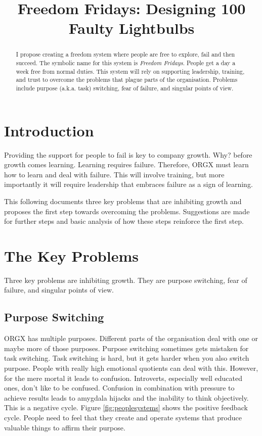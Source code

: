 \documentclass[conference]{IEEEtran}
\begin{document}
\title{Freedom Fridays: Designing 100 Faulty Lightbulbs}

\author{
}

\maketitle

\begin{abstract}
I propose creating a freedom system where people are free to explore, fail and
then succeed. The symbolic name for this system is \emph{Freedom Fridays}.
People get a day a week free from normal duties. This system will rely on
supporting leadership, training, and trust to overcome the problems that plague
parts of the organisation. Problems include purpose (a.k.a. task) switching,
fear of failure, and singular points of view.
\end{abstract}

\section{Introduction}
Providing the support for people to fail is key to company growth. Why? before
growth comes learning. Learning requires failure. Therefore, ORGX must
learn how to learn and deal with failure. This will involve training, but more
importantly it will require leadership that embraces failure as a sign of learning.

This following documents three key problems that are inhibiting growth and
proposes the first step towards overcoming the problems. Suggestions are made
for further steps and basic analysis of how these steps reinforce the first
step.

\section{The Key Problems}
Three key problems are inhibiting growth. They are purpose switching, fear of
failure, and singular points of view.

\subsection{Purpose Switching}
ORGX has multiple purposes. Different parts of the organisation deal with one
or maybe more of those purposes. Purpose switching sometimes gets mistaken for
task switching. Task switching is hard, but it gets harder when you also switch
purpose. People with really high emotional quotients can deal with this.
However, for the mere mortal it leads to confusion. Introverts, especially well
educated ones, don't like to be confused. Confusion in combination with pressure
to achieve results leads to amygdala hijacks and the inability to think
objectively. This is a negative cycle. Figure \ref{fig:peoplesystems} shows the
positive feedback cycle. People need to feel that they create and operate
systems that produce valuable things to affirm their purpose.
\end{document}
